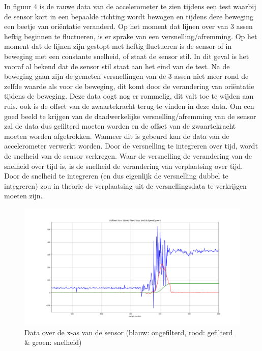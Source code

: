 \documentclass[a4paper, 11pt]{article} %
\begin{document}
In figuur 4 is de rauwe data van de accelerometer te zien tijdens een test waarbij de sensor kort in een bepaalde richting wordt bewogen en tijdens deze beweging een beetje van oriëntatie veranderd. Op het moment dat lijnen over van 3 assen heftig beginnen te fluctueren, is er sprake van een versnelling/afremming. Op het moment dat de lijnen zijn gestopt met heftig fluctueren is de sensor of in beweging met een constante snelheid, of staat de sensor stil. In dit geval is het vooraf al bekend dat de sensor stil staat aan het eind van de test. Na de beweging gaan zijn de gemeten versnellingen van de 3 assen niet meer rond de zelfde waarde als voor de beweging, dit komt door de verandering van oriëntatie tijdens de beweging. Deze data oogt nog er rommelig, dit valt toe te wijden aan ruis. ook is de offset van de zwaartekracht terug te vinden in deze data. Om een goed beeld te krijgen van de daadwerkelijke versnelling/afremming van de sensor zal de data dus gefilterd moeten worden en de offset van de zwaartekracht moeten worden afgetrokken. Wanneer dit is gebeurd kan de data van de accelerometer verwerkt worden. Door de versnelling te integreren over tijd, wordt de snelheid van de sensor verkregen. Waar de versnelling de verandering van de snelheid over tijd is, is de snelheid de verandering van verplaatsing over tijd. Door de snelheid te integreren (en dus eigenlijk de versnelling dubbel te integreren) zou in theorie de verplaatsing uit de versnellingsdata te verkrijgen moeten zijn.
\newpage
\begin{figure}[h!]
	\centering
	\hspace*{-2cm}
	\includegraphics[width=16cm]{afbeeldingen/XasPlot.png}
	\caption{Data over de x-as van de sensor (blauw: ongefilterd, rood: gefilterd \& groen: snelheid)}
\end{figure}
\end{document}
